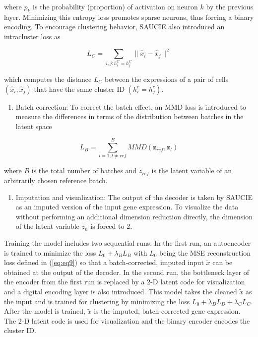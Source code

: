 \documentclass[
]{book}
\providecommand{\tightlist}{%
  \setlength{\itemsep}{0pt}\setlength{\parskip}{0pt}}
\begin{document}
where \(p_{k}\) is the probability (proportion) of activation on neuron \(k\) by the previous layer. Minimizing this entropy loss promotes sparse neurons, thus forcing a binary encoding. To encourage clustering behavior, SAUCIE also introduced an intracluster loss as

\begin{equation}
L_{C} = \sum_{i,j:h_{i}^{C}=h_{j}^{C}} \| \widehat{x}_{i}-\widehat{x}_{j}\|^{2} \label{eq:eq38}
\end{equation}

which computes the distance \(L_{C}\) between the expressions of a pair of cells \((\widehat{x}_{i},\widehat{x}_{j})\) that have the same cluster ID \((h_{i}^{c}=h_{j}^{c})\).

\begin{enumerate}
\def\labelenumi{\arabic{enumi}.}
\setcounter{enumi}{1}
\tightlist
\item
  Batch correction: To correct the batch effect, an MMD loss is introduced to measure the differences in terms of the distribution between batches in the latent space
\end{enumerate}

\begin{equation}
L_{B} = \sum_{l=1,l\ne ref}^{B}MMD(\mathbf{z}_{ref},\mathbf{z}_{l}) \label{eq:eq39}
\end{equation}

where \(B\) is the total number of batches and \(z_{ref}\) is the latent variable of an arbitrarily chosen reference batch.

\begin{enumerate}
\def\labelenumi{\arabic{enumi}.}
\setcounter{enumi}{2}
\tightlist
\item
  Imputation and visualization: The output of the decoder is taken by SAUCIE as an imputed version of the input gene expression. To visualize the data without performing an additional dimension reduction directly, the dimension of the latent variable \(z_{n}\) is forced to 2.
\end{enumerate}

Training the model includes two sequential runs. In the first run, an autoencoder is trained to minimize the loss \(L_{0}+ \lambda_{B}L_{B}\) with \(L_{0}\) being the MSE reconstruction loss defined in (\eqref{eq:eq9}) so that a batch-corrected, imputed input \(\tilde{x}\) can be obtained at the output of the decoder. In the second run, the bottleneck layer of the encoder from the first run is replaced by a 2-D latent code for visualization and a digital encoding layer is also introduced. This model takes the cleaned \(\tilde{x}\) as the input and is trained for clustering by minimizing the loss \(L_{0}+\lambda_{D}L_{D}+\lambda_{C}L_{C}\). After the model is trained, \(\tilde{x}\) is the imputed, batch-corrected gene expression. The 2-D latent code is used for visualization and the binary encoder encodes the cluster ID.
\end{document}
